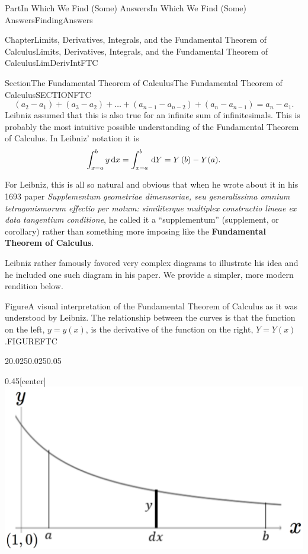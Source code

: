 \documentclass[oneside,10pt,]{book}
\newcommand{\terminology}[1]{\textbf{#1}}
\numberwithin{equation}{part}
\newcommand{\dx}[1]{\,{\rm d}#1}
\begin{document}
\begin{partptx}{Part}{In Which We Find (Some) Answers}{}{In Which We Find (Some) Answers}{}{}{FindingAnswers}
\begin{chapterptx}{Chapter}{Limits, Derivatives, Integrals, and the Fundamental Theorem of Calculus}{}{Limits, Derivatives, Integrals, and the Fundamental Theorem of Calculus}{}{}{LimDerivIntFTC}
\begin{sectionptx}{Section}{The Fundamental Theorem of Calculus}{}{The Fundamental Theorem of Calculus}{}{}{SECTIONFTC}
\begin{equation*}
\left(a_2-a_1\right)+\left(a_3-a_2\right)+\dots
+\left(a_{n-1}-a_{n-2}\right)+\left(a_n-a_{n-1}\right)=a_n-a_1\text{.}
\end{equation*}
Leibniz assumed that this is also true for an infinite sum of infinitesimals. This is probably the most intuitive possible understanding of the Fundamental Theorem of Calculus. In Leibniz' notation it is%
\begin{equation}
\int^b_{x=a}{y\dx{x}}=\int^b_{x=a}{\dx{Y}}=Y\left(b\right)-Y(a)\text{.}\label{EQUATIONFTCLeibniz}
\end{equation}
%
\par
For Leibniz, this is all so natural and obvious that when he wrote about it in his 1693 paper \textit{Supplementum geometriae dimensoriae, seu generalissima omnium tetragonismorum effectio per motum: similiterque multiplex constructio lineae ex data tangentium conditione},     he called it a ``supplementum'' (supplement, or corollary) rather than something more  imposing \textemdash{} like the \terminology{Fundamental Theorem of Calculus}.%
\par
Leibniz rather famously favored very complex diagrams to illustrate his idea and he included one such diagram in his paper. We provide a simpler, more modern rendition below.%
\begin{figureptx}{Figure}{A visual interpretation of the Fundamental Theorem of Calculus as it was understood by Leibniz.  The relationship between the curves is that the function on the  left, \(y=y(x)\), is the  derivative of the function  on the right, \(Y=Y(x)\).}{FIGUREFTC}{}%
\begin{sidebyside}{2}{0.025}{0.025}{0.05}%
\begin{sbspanel}{0.45}[center]%
\noindent\includegraphics[width=\linewidth]{external/images/FTC1.png}
\end{sbspanel}%

\end{sidebyside}
\end{figureptx}
\end{sectionptx}
\end{chapterptx}
\end{partptx}
\end{document}
